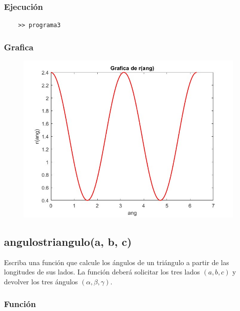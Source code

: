 \documentclass{article}
\begin{document}
	\subsubsection{Ejecución}
	
	\begin{lstlisting}
	>> programa3
	\end{lstlisting}
	
	\subsubsection{Grafica}
	
	\begin{figure}[H]
		\centering
		\includegraphics[width=\textwidth]{img2.jpg}
	\end{figure}
	
	\newpage
	\subsection{angulostriangulo(a, b, c)}
	
	Escriba una función que calcule los ángulos de un triángulo a partir de las longitudes de sus lados. La función deberá solicitar los tres lados $(a, b, c)$ y devolver los tres ángulos $(\alpha, \beta, \gamma)$.
	
	\subsubsection{Función}
	
\end{document}
